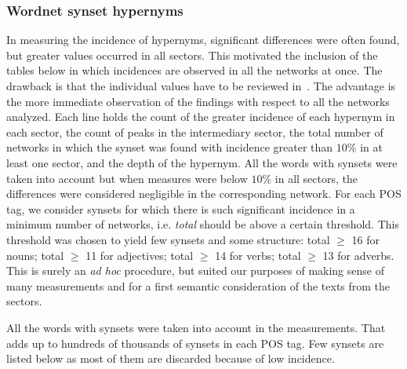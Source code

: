 \subsubsection{Wordnet synset hypernyms}\label{subsec:wn1}
In measuring the incidence of hypernyms, significant differences were often found, but greater values
occurred in all sectors.
This motivated the inclusion of the tables below in which incidences are observed in all the networks at once.
The drawback is that the individual values have to be reviewed in~\cite{textTables}.
The advantage is the more immediate observation of the findings with respect to all the networks analyzed.
Each line holds the count of the greater incidence of each hypernym in each sector,
the count of peaks in the intermediary sector, the total number of networks in which the
synset was found with incidence greater than $10\%$ in at least one sector,
and the depth of the hypernym.
All the words with synsets were taken into account but when measures were below $10\%$ in all
sectors, the differences were considered negligible in the corresponding network.
For each POS tag, we consider synsets for which there is such significant incidence in a minimum number of networks,
i.e. \emph{total} should be above a certain threshold.
This threshold was chosen to yield few synsets and some structure:
total $\geq$ 16 for nouns;
total $\geq$ 11 for adjectives;
total $\geq$ 14 for verbs;
total $\geq$ 13 for adverbs.
This is surely an \emph{ad hoc} procedure,
but suited our purposes of making sense of many measurements
and for a first semantic consideration of the texts from the sectors. 

All the words with synsets were taken into account in the measurements.
That adds up to hundreds of thousands of synsets in each POS tag.
Few synsets are listed below as most of them are discarded because of low incidence. 


